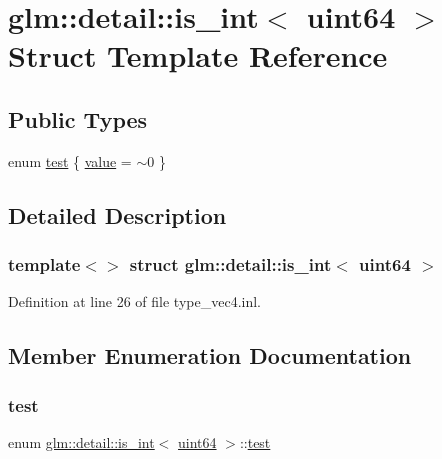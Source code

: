 \hypertarget{structglm_1_1detail_1_1is__int_3_01uint64_01_4}{}\section{glm\+::detail\+::is\+\_\+int$<$ uint64 $>$ Struct Template Reference}
\label{structglm_1_1detail_1_1is__int_3_01uint64_01_4}
\subsection*{Public Types}
\begin{DoxyCompactItemize}
\item 
enum \mbox{\hyperlink{structglm_1_1detail_1_1is__int_3_01uint64_01_4_a8be9e204582a6cf6049dac4a685cb868}{test}} \{ \mbox{\hyperlink{structglm_1_1detail_1_1is__int_3_01uint64_01_4_a8be9e204582a6cf6049dac4a685cb868a78866d286f2c5661c099f47ae16450cc}{value}} = $\sim$0
 \}
\end{DoxyCompactItemize}


\subsection{Detailed Description}
\subsubsection*{template$<$$>$\newline
struct glm\+::detail\+::is\+\_\+int$<$ uint64 $>$}



Definition at line 26 of file type\+\_\+vec4.\+inl.



\subsection{Member Enumeration Documentation}
\mbox{\label{structglm_1_1detail_1_1is__int_3_01uint64_01_4_a8be9e204582a6cf6049dac4a685cb868}} 
\subsubsection{\texorpdfstring{test}{test}}
{\footnotesize\ttfamily enum \mbox{\hyperlink{structglm_1_1detail_1_1is__int}{glm\+::detail\+::is\+\_\+int}}$<$ \mbox{\hyperlink{namespaceglm_1_1detail_adec4b19bf4982125e122db2fe03c5810}{uint64}} $>$\+::\mbox{\hyperlink{structglm_1_1detail_1_1is__int_3_01uint64_01_4_a8be9e204582a6cf6049dac4a685cb868}{test}}}

